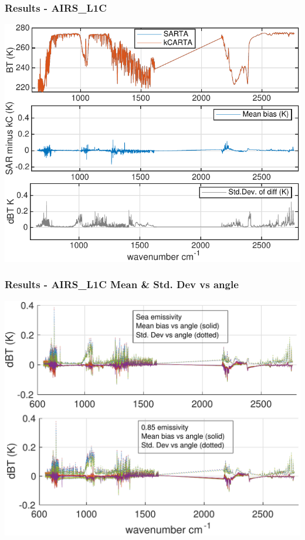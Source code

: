 \documentclass[10pt,t]{beamer}
\begin{document}
\begin{frame}
  \frametitle{Results - AIRS\_L1C}
  \begin{center}
    \includegraphics[width=0.9\linewidth]{./Figs/Pdf/kc_sar_airs_l1c_mean_bias_stdv_sea_6angs_aslp.pdf}
  \end{center}
      
 \end{frame}

\begin{frame}
  \frametitle{Results - AIRS\_L1C Mean \& Std. Dev vs angle}

  \begin{center}
    \includegraphics[width=0.9\linewidth]{./Figs/Pdf/kc_sar_airs_l1c_mean_stdv_emiss_vs_angle_v2.pdf}
  \end{center}
  
  \end{frame}
\end{document}
